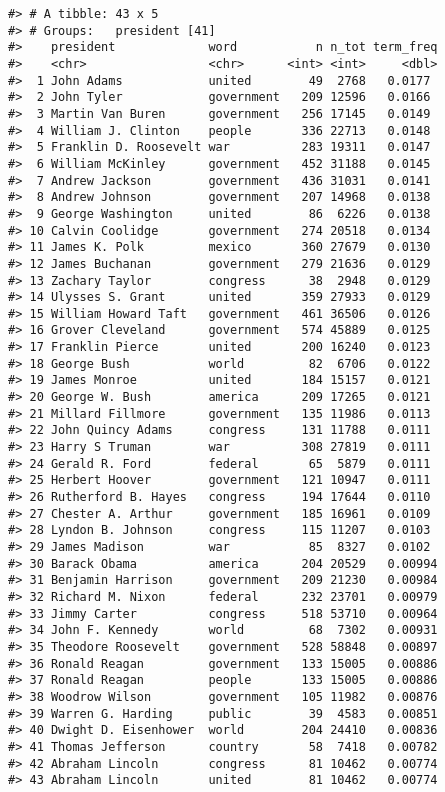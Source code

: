 \documentclass[
]{book}
\begin{document}
\begin{verbatim}
#> # A tibble: 43 x 5
#> # Groups:   president [41]
#>    president             word           n n_tot term_freq
#>    <chr>                 <chr>      <int> <int>     <dbl>
#>  1 John Adams            united        49  2768   0.0177 
#>  2 John Tyler            government   209 12596   0.0166 
#>  3 Martin Van Buren      government   256 17145   0.0149 
#>  4 William J. Clinton    people       336 22713   0.0148 
#>  5 Franklin D. Roosevelt war          283 19311   0.0147 
#>  6 William McKinley      government   452 31188   0.0145 
#>  7 Andrew Jackson        government   436 31031   0.0141 
#>  8 Andrew Johnson        government   207 14968   0.0138 
#>  9 George Washington     united        86  6226   0.0138 
#> 10 Calvin Coolidge       government   274 20518   0.0134 
#> 11 James K. Polk         mexico       360 27679   0.0130 
#> 12 James Buchanan        government   279 21636   0.0129 
#> 13 Zachary Taylor        congress      38  2948   0.0129 
#> 14 Ulysses S. Grant      united       359 27933   0.0129 
#> 15 William Howard Taft   government   461 36506   0.0126 
#> 16 Grover Cleveland      government   574 45889   0.0125 
#> 17 Franklin Pierce       united       200 16240   0.0123 
#> 18 George Bush           world         82  6706   0.0122 
#> 19 James Monroe          united       184 15157   0.0121 
#> 20 George W. Bush        america      209 17265   0.0121 
#> 21 Millard Fillmore      government   135 11986   0.0113 
#> 22 John Quincy Adams     congress     131 11788   0.0111 
#> 23 Harry S Truman        war          308 27819   0.0111 
#> 24 Gerald R. Ford        federal       65  5879   0.0111 
#> 25 Herbert Hoover        government   121 10947   0.0111 
#> 26 Rutherford B. Hayes   congress     194 17644   0.0110 
#> 27 Chester A. Arthur     government   185 16961   0.0109 
#> 28 Lyndon B. Johnson     congress     115 11207   0.0103 
#> 29 James Madison         war           85  8327   0.0102 
#> 30 Barack Obama          america      204 20529   0.00994
#> 31 Benjamin Harrison     government   209 21230   0.00984
#> 32 Richard M. Nixon      federal      232 23701   0.00979
#> 33 Jimmy Carter          congress     518 53710   0.00964
#> 34 John F. Kennedy       world         68  7302   0.00931
#> 35 Theodore Roosevelt    government   528 58848   0.00897
#> 36 Ronald Reagan         government   133 15005   0.00886
#> 37 Ronald Reagan         people       133 15005   0.00886
#> 38 Woodrow Wilson        government   105 11982   0.00876
#> 39 Warren G. Harding     public        39  4583   0.00851
#> 40 Dwight D. Eisenhower  world        204 24410   0.00836
#> 41 Thomas Jefferson      country       58  7418   0.00782
#> 42 Abraham Lincoln       congress      81 10462   0.00774
#> 43 Abraham Lincoln       united        81 10462   0.00774
\end{verbatim}
\end{document}
